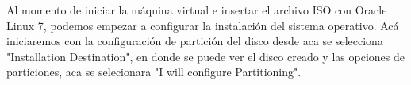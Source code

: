 \documentclass{article}
\begin{document}
Al momento de iniciar la máquina virtual e insertar el archivo ISO con Oracle Linux 7, podemos empezar a configurar la instalación del sistema operativo. Acá iniciaremos con la configuración de partición del disco desde aca se selecciona "Installation Destination", en donde se puede ver el disco creado y las opciones de particiones, aca se selecionara "I will configure Partitioning".
\end{document}
